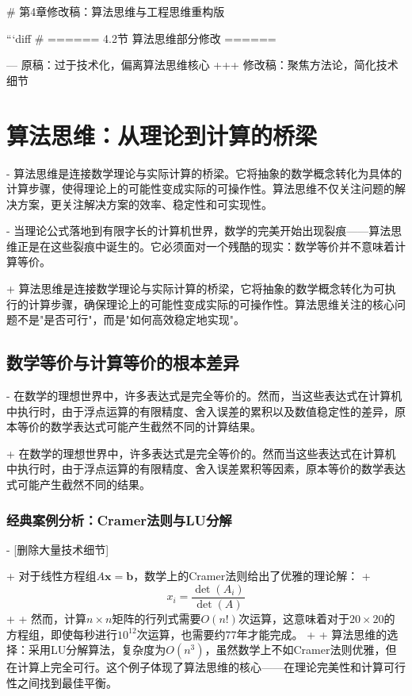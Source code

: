 # 第4章修改稿：算法思维与工程思维重构版

```diff
# ====== 4.2节 算法思维部分修改 ======

--- 原稿：过于技术化，偏离算法思维核心
+++ 修改稿：聚焦方法论，简化技术细节

\section{算法思维：从理论到计算的桥梁}

- 算法思维是连接数学理论与实际计算的桥梁。它将抽象的数学概念转化为具体的计算步骤，使得理论上的可能性变成实际的可操作性。算法思维不仅关注问题的解决方案，更关注解决方案的效率、稳定性和可实现性。

- 当理论公式落地到有限字长的计算机世界，数学的完美开始出现裂痕——算法思维正是在这些裂痕中诞生的。它必须面对一个残酷的现实：数学等价并不意味着计算等价。

+ 算法思维是连接数学理论与实际计算的桥梁，它将抽象的数学概念转化为可执行的计算步骤，确保理论上的可能性变成实际的可操作性。算法思维关注的核心问题不是"是否可行"，而是"如何高效稳定地实现"。

\subsection{数学等价与计算等价的根本差异}

- 在数学的理想世界中，许多表达式是完全等价的。然而，当这些表达式在计算机中执行时，由于浮点运算的有限精度、舍入误差的累积以及数值稳定性的差异，原本等价的数学表达式可能产生截然不同的计算结果。

+ 在数学的理想世界中，许多表达式是完全等价的。然而当这些表达式在计算机中执行时，由于浮点运算的有限精度、舍入误差累积等因素，原本等价的数学表达式可能产生截然不同的结果。

\subsubsection{经典案例分析：Cramer法则与LU分解}

- [删除大量技术细节]

+ 对于线性方程组$A\mathbf{x} = \mathbf{b}$，数学上的Cramer法则给出了优雅的理论解：
+ $$x_i = \frac{\det(A_i)}{\det(A)}$$
+
+ 然而，计算$n \times n$矩阵的行列式需要$O(n!)$次运算，这意味着对于$20 \times 20$的方程组，即使每秒进行$10^{12}$次运算，也需要约77年才能完成。
+
+ 算法思维的选择：采用LU分解算法，复杂度为$O(n^3)$，虽然数学上不如Cramer法则优雅，但在计算上完全可行。这个例子体现了算法思维的核心——在理论完美性和计算可行性之间找到最佳平衡。

